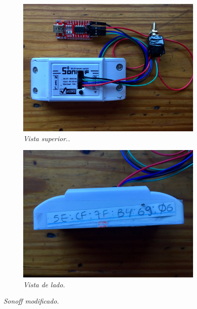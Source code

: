 \begin{figure}[h!]
  \centering

  \begin{subfigure}[b]{0.5\textwidth}
    \includegraphics[width=\textwidth, keepaspectratio]{images/sonoff-modified}
    \caption{\textit{Vista superior..}}
    \label{fig:images/sonoff-modified}
  \end{subfigure}
  \begin{subfigure}[b]{0.5\textwidth}
    \includegraphics[width=\textwidth, keepaspectratio]{images/sonoff-side}
    \caption{\textit{Vista de lado.}}
    \label{fig:sonoff-side}
  \end{subfigure}

\caption{\textit{Sonoff modificado.}}
\end{figure}

